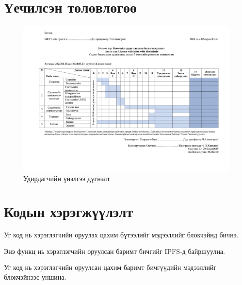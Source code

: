 \appendix
{}

\chapter{Үечилсэн төлөвлөгөө}
\begin{figure}[h!]
   \centering
   \includegraphics[scale=0.065, angle=90]{src/images/periodic-plan.png}
   \caption{Удирдагчийн үнэлгээ дүгнэлт}
\end{figure}


\chapter{Кодын хэрэгжүүлэлт}


Уг код нь хэрэглэгчийн оруулах цахим бүтээлийг  мэдээллийг блокчэйнд бичнэ.


Энэ функц нь хэрэглэгчийн оруулсан баримт бичгийг IPFS-д байршуулна.


Уг код нь хэрэглэгчийн оруулсан цахим баримт бичгүүдийн мэдээллийг блокчэйнээс уншина.


